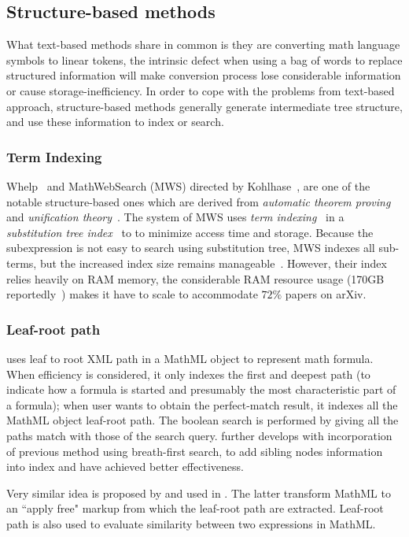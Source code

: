 \subsection{Structure-based methods}
What text-based methods share in common is they are converting math language symbols to linear tokens, the intrinsic defect when using a bag of words to replace structured information will make conversion process lose considerable information or cause storage-inefficiency.
In order to cope with the problems from text-based approach, structure-based methods generally generate intermediate tree structure, and use these information to index or search.

\subsubsection*{Term Indexing}
Whelp~\cite{whelp04} and MathWebSearch (MWS) directed by Kohlhase~\cite{Kohlhase06,Kohlhase0p4,Kohlhase0p5}, are one of the notable structure-based ones which are derived from \textit{automatic theorem proving} and \textit{unification theory}~\cite{AIbook}. The system of MWS uses \textit{term indexing}~\cite{graf96} in a \textit{substitution tree index}~\cite{graf96} to to minimize access time and storage. Because the subexpression is not easy to search using substitution tree, MWS indexes all sub-terms, but the increased index size remains manageable~\cite{Kohlhase06}. However, their index relies heavily on RAM memory, 
the considerable RAM resource usage (170GB reportedly~\cite{Kohlhase0p5}) makes it have to scale to accommodate $72\%$ papers on arXiv. 

\subsubsection*{Leaf-root path}
\label{leafrootmethod}
\cite{MathMLleafroot} uses leaf to root XML path in a MathML object to represent math formula. When efficiency is considered, it only indexes the first and deepest path (to indicate how a formula is started and presumably the most characteristic part of a formula); 
when user wants to obtain the perfect-match result, it indexes all the MathML object leaf-root path. The boolean search is performed by giving all the paths match with those of the search query. 
\cite{sefobyfo} further develops with incorporation of previous method using breath-first search, to add sibling nodes information into index and have achieved better effectiveness.

Very similar idea is proposed by \cite{signifjap} and used in \cite{signfused}. The latter transform MathML to an ``apply free" markup from which the leaf-root path are extracted. Leaf-root path is also used to evaluate similarity between two expressions in MathML.

